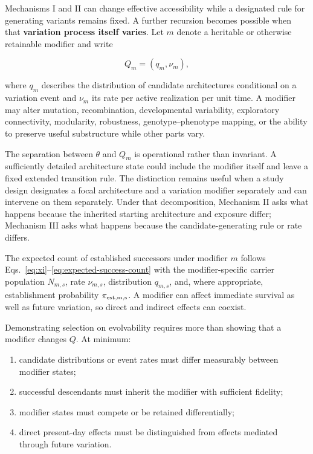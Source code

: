 \documentclass[11pt,a4paper]{article}
\begin{document}
Mechanisms I and II can change effective accessibility while a designated rule for generating variants remains fixed. A further recursion becomes possible when that \textbf{variation process itself varies}. Let $m$ denote a heritable or otherwise retainable modifier and write

\[
Q_m=(q_m,\nu_m),
\]

where $q_m$ describes the distribution of candidate architectures conditional on a variation event and $\nu_m$ its rate per active realization per unit time. A modifier may alter mutation, recombination, developmental variability, exploratory connectivity, modularity, robustness, genotype--phenotype mapping, or the ability to preserve useful substructure while other parts vary.

The separation between $\theta$ and $Q_m$ is operational rather than invariant. A sufficiently detailed architecture state could include the modifier itself and leave a fixed extended transition rule. The distinction remains useful when a study design designates a focal architecture and a variation modifier separately and can intervene on them separately. Under that decomposition, Mechanism II asks what happens because the inherited starting architecture and exposure differ; Mechanism III asks what happens because the candidate-generating rule or rate differs.

The expected count of established successors under modifier $m$ follows Eqs.~\eqref{eq:xi}--\eqref{eq:expected-success-count} with the modifier-specific carrier population $N_{m,s}$, rate $\nu_{m,s}$, distribution $q_{m,s}$, and, where appropriate, establishment probability $\pi_{\rm est,m,s}$. A modifier can affect immediate survival as well as future variation, so direct and indirect effects can coexist.

Demonstrating selection on evolvability requires more than showing that a modifier changes $Q$. At minimum:

\begin{enumerate}
\item candidate distributions or event rates must differ measurably between modifier states;
\item successful descendants must inherit the modifier with sufficient fidelity;
\item modifier states must compete or be retained differentially;
\item direct present-day effects must be distinguished from effects mediated through future variation.
\end{enumerate}
\end{document}
